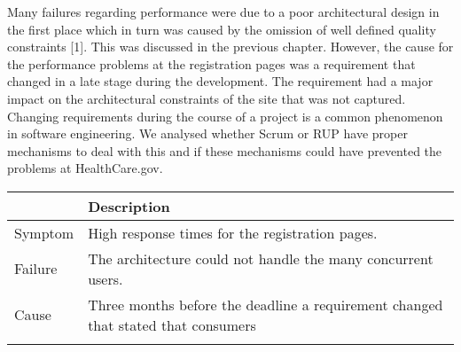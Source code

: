 \documentclass[]{article}
\begin{document}
Many failures regarding performance were due to a poor architectural
design in the first place which in turn was caused by the omission of
well defined quality constraints {[}1{]}. This was discussed in the
previous chapter. However, the cause for the performance problems at the
registration pages was a requirement that changed in a late stage during
the development. The requirement had a major impact on the architectural
constraints of the site that was not captured. Changing requirements
during the course of a project is a common phenomenon in software
engineering. We analysed whether Scrum or RUP have proper mechanisms to
deal with this and if these mechanisms could have prevented the problems
at HealthCare.gov.

\begin{longtable}[c]{@{}ll@{}}
\toprule
\begin{minipage}[b]{0.09\columnwidth}\raggedright\strut
\strut\end{minipage} &
\begin{minipage}[b]{0.85\columnwidth}\raggedright\strut
Description
\strut\end{minipage}\tabularnewline
\midrule
\endhead
\begin{minipage}[t]{0.09\columnwidth}\raggedright\strut
Symptom
\strut\end{minipage} &
\begin{minipage}[t]{0.85\columnwidth}\raggedright\strut
High response times for the registration pages.
\strut\end{minipage}\tabularnewline
\begin{minipage}[t]{0.09\columnwidth}\raggedright\strut
Failure
\strut\end{minipage} &
\begin{minipage}[t]{0.85\columnwidth}\raggedright\strut
The architecture could not handle the many concurrent users.
\strut\end{minipage}\tabularnewline
\begin{minipage}[t]{0.09\columnwidth}\raggedright\strut
Cause
\strut\end{minipage} &
\begin{minipage}[t]{0.85\columnwidth}\raggedright\strut
Three months before the deadline a requirement changed that stated that
consumers
\strut\end{minipage}\tabularnewline
\begin{minipage}[t]{0.09\columnwidth}\raggedright\strut
\strut\end{minipage} &
\begin{minipage}[t]{0.85\columnwidth}\raggedright\strut

\end{minipage}
\end{longtable}
\end{document}
